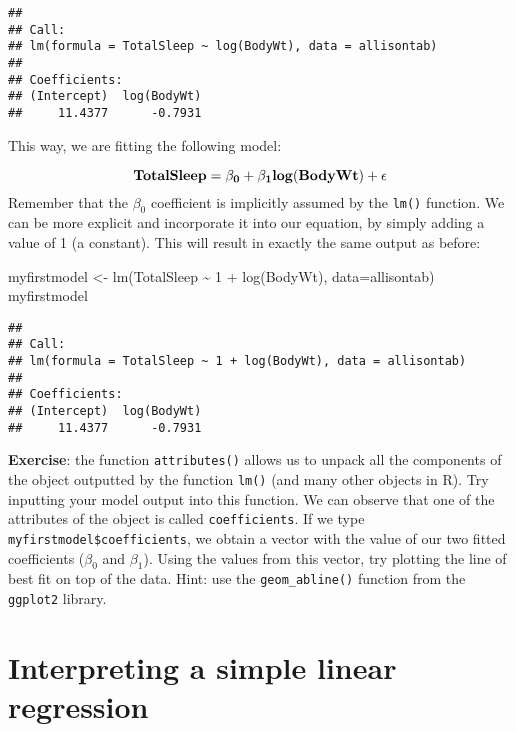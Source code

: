 \documentclass[
]{book}
\newenvironment{Shaded}{\begin{snugshade}}{\end{snugshade}}
\newcommand{\AttributeTok}[1]{\textcolor[rgb]{0.77,0.63,0.00}{#1}}
\newcommand{\DecValTok}[1]{\textcolor[rgb]{0.00,0.00,0.81}{#1}}
\newcommand{\FunctionTok}[1]{\textcolor[rgb]{0.00,0.00,0.00}{#1}}
\newcommand{\NormalTok}[1]{#1}
\newcommand{\OtherTok}[1]{\textcolor[rgb]{0.56,0.35,0.01}{#1}}
\newcommand{\SpecialCharTok}[1]{\textcolor[rgb]{0.00,0.00,0.00}{#1}}
\begin{document}
\begin{verbatim}
## 
## Call:
## lm(formula = TotalSleep ~ log(BodyWt), data = allisontab)
## 
## Coefficients:
## (Intercept)  log(BodyWt)  
##     11.4377      -0.7931
\end{verbatim}

This way, we are fitting the following model:

\[\bf{TotalSleep} = \beta_0 + \beta_1 \bf{log(BodyWt)} + \bf{\epsilon}\]
Remember that the \(\beta_0\) coefficient is implicitly assumed by the \texttt{lm()} function. We can be more explicit and incorporate it into our equation, by simply adding a value of 1 (a constant). This will result in exactly the same output as before:

\begin{Shaded}
\begin{Highlighting}[]
\NormalTok{myfirstmodel }\OtherTok{\textless{}{-}} \FunctionTok{lm}\NormalTok{(TotalSleep }\SpecialCharTok{\textasciitilde{}} \DecValTok{1} \SpecialCharTok{+} \FunctionTok{log}\NormalTok{(BodyWt), }\AttributeTok{data=}\NormalTok{allisontab)  }
\NormalTok{myfirstmodel}
\end{Highlighting}
\end{Shaded}

\begin{verbatim}
## 
## Call:
## lm(formula = TotalSleep ~ 1 + log(BodyWt), data = allisontab)
## 
## Coefficients:
## (Intercept)  log(BodyWt)  
##     11.4377      -0.7931
\end{verbatim}

\textbf{Exercise}: the function \texttt{attributes()} allows us to unpack all the components of the object outputted by the function \texttt{lm()} (and many other objects in R). Try inputting your model output into this function. We can observe that one of the attributes of the object is called \texttt{coefficients}. If we type \texttt{myfirstmodel\$coefficients}, we obtain a vector with the value of our two fitted coefficients (\(\beta_0\) and \(\beta_1\)). Using the values from this vector, try plotting the line of best fit on top of the data. Hint: use the \texttt{geom\_abline()} function from the \texttt{ggplot2} library.

\hypertarget{interpreting-a-simple-linear-regression}{%
\section{Interpreting a simple linear regression}\label{interpreting-a-simple-linear-regression}}
\end{document}
